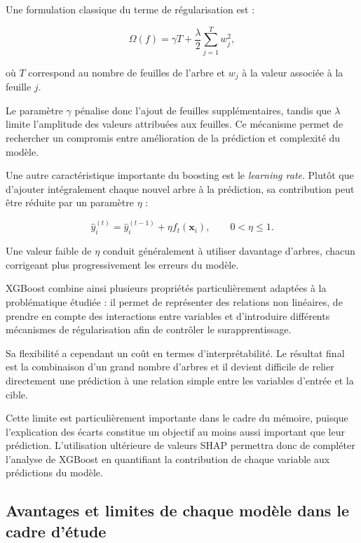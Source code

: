 Une formulation classique du terme de régularisation est :

\begin{equation}
    \Omega(f)
    =
    \gamma T
    +
    \frac{\lambda}{2}
    \sum_{j=1}^{T} w_j^2,
\end{equation}

où $T$ correspond au nombre de feuilles de l'arbre et $w_j$ à la valeur associée à la feuille $j$.

Le paramètre $\gamma$ pénalise donc l'ajout de feuilles supplémentaires, tandis que $\lambda$ limite l'amplitude des valeurs attribuées aux feuilles. Ce mécanisme permet de rechercher un compromis entre amélioration de la prédiction et complexité du modèle.

Une autre caractéristique importante du boosting est le \textit{learning rate}. Plutôt que d'ajouter intégralement chaque nouvel arbre à la prédiction, sa contribution peut être réduite par un paramètre $\eta$ :

\begin{equation}
    \widehat{y}_i^{(t)}
    =
    \widehat{y}_i^{(t-1)}
    +
    \eta f_t(\mathbf{x}_i),
    \qquad
    0 < \eta \leq 1.
\end{equation}

Une valeur faible de $\eta$ conduit généralement à utiliser davantage d'arbres, chacun corrigeant plus progressivement les erreurs du modèle.

XGBoost combine ainsi plusieurs propriétés particulièrement adaptées à la problématique étudiée : il permet de représenter des relations non linéaires, de prendre en compte des interactions entre variables et d'introduire différents mécanismes de régularisation afin de contrôler le surapprentissage.

Sa flexibilité a cependant un coût en termes d'interprétabilité. Le résultat final est la combinaison d'un grand nombre d'arbres et il devient difficile de relier directement une prédiction à une relation simple entre les variables d'entrée et la cible.

Cette limite est particulièrement importante dans le cadre du mémoire, puisque l'explication des écarts constitue un objectif au moins aussi important que leur prédiction. L'utilisation ultérieure de valeurs SHAP permettra donc de compléter l'analyse de XGBoost en quantifiant la contribution de chaque variable aux prédictions du modèle.


\subsection{Avantages et limites de chaque modèle dans le cadre d'étude}

